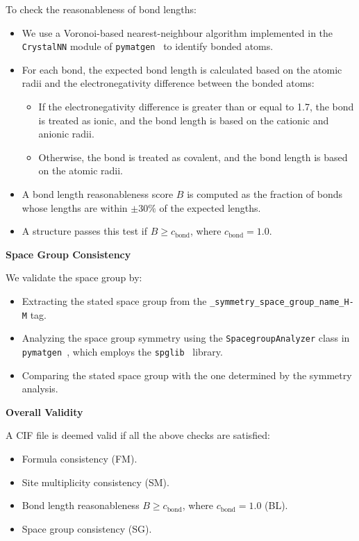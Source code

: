 To check the reasonableness of bond lengths:
\begin{itemize}
    \item We use a Voronoi-based nearest-neighbour algorithm implemented in the \texttt{CrystalNN} module of \texttt{pymatgen}~\cite{Ong2013} to identify bonded atoms.
    \item For each bond, the expected bond length is calculated based on the atomic radii and the electronegativity difference between the bonded atoms:
    \begin{itemize}
        \item If the electronegativity difference is greater than or equal to 1.7, the bond is treated as ionic, and the bond length is based on the cationic and anionic radii.
        \item Otherwise, the bond is treated as covalent, and the bond length is based on the atomic radii.
    \end{itemize}
    \item A bond length reasonableness score $B$ is computed as the fraction of bonds whose lengths are within $\pm30\%$ of the expected lengths.
    \item A structure passes this test if $B \geq c_{\text{bond}}$, where $c_{\text{bond}} = 1.0$.
\end{itemize}

\textbf{Space Group Consistency}

We validate the space group by:
\begin{itemize}
    \item Extracting the stated space group from the \texttt{\_symmetry\_space\_group\_name\_H-M} tag.
    \item Analyzing the space group symmetry using the \texttt{SpacegroupAnalyzer} class in \texttt{pymatgen~\cite{Ong2013}}, which employs the \texttt{spglib}~\cite{Togo_texttt_Spglib_a_software_2018} library.
    \item Comparing the stated space group with the one determined by the symmetry analysis.
\end{itemize}

\textbf{Overall Validity}

A CIF file is deemed valid if all the above checks are satisfied:
\begin{itemize}
    \item Formula consistency (FM).
    \item Site multiplicity consistency (SM).
    \item Bond length reasonableness $B \geq c_{\text{bond}}$, where $c_{\text{bond}} = 1.0$ (BL).
    \item Space group consistency (SG).
\end{itemize}


